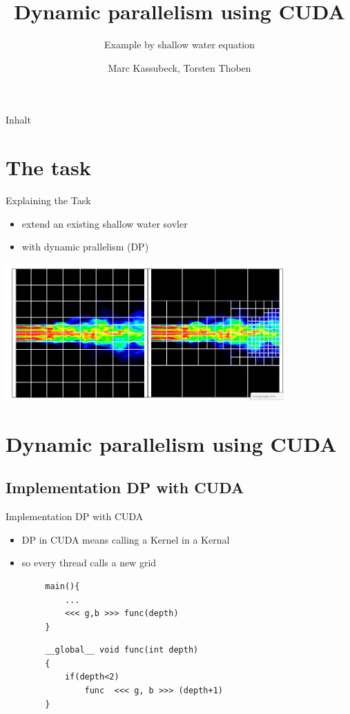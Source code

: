\documentclass[fleqn,11pt,aspectratio=43]{beamer}
\title{Dynamic parallelism using CUDA}
\subtitle{Example by shallow water equation}
\author{Marc Kassubeck, Torsten Thoben}
\begin{document}
\begin{frame}[plain]
\titlepage
\end{frame}

\begin{frame}{Inhalt}
\tableofcontents
\end{frame}


\section{The task}
\begin{frame}{Explaining the Task}
	\begin{itemize}
		\item extend an existing shallow water sovler
		\item with dynamic prallelism (DP)
	\end{itemize}
	\centering
	\includegraphics[width=0.8\textwidth]{dynamicparallelism.png}
\end{frame}

\section{Dynamic parallelism using CUDA}

\subsection{Implementation DP with CUDA}	
\begin{frame}[fragile]{Implementation DP with CUDA}
	\begin{itemize}
		\item DP in CUDA means calling a Kernel in a Kernal
		\item so every thread calls a new grid
	\end{itemize}

	\begin{verbatim}
		main(){
		    ...
		    <<< g,b >>> func(depth)
		}
	\end{verbatim}	

	\begin{verbatim}
		__global__ void func(int depth)
		{
		    if(depth<2)
		        func  <<< g, b >>> (depth+1)
		}
	\end{verbatim}
\end{frame}
\end{document}

